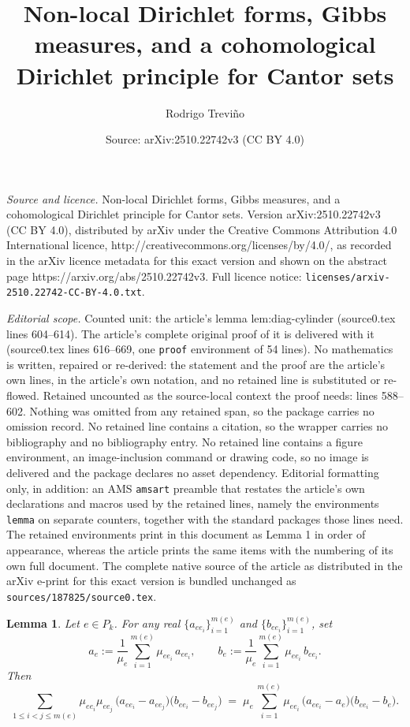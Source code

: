 \documentclass[10pt,a4paper]{amsart}
\title{Non-local Dirichlet forms, Gibbs measures, and a cohomological Dirichlet principle for Cantor sets}
\author{Rodrigo Trevi\~no}
\date{Source: arXiv:2510.22742v3 (CC BY 4.0)}
\newtheorem{lemma}{Lemma}
\begin{document}
\maketitle

\noindent\emph{Source and licence.} Non-local Dirichlet forms, Gibbs measures, and a cohomological Dirichlet principle for Cantor sets. Version arXiv:2510.22742v3 (CC BY 4.0), distributed by arXiv under the Creative Commons Attribution 4.0 International licence, http://creativecommons.org/licenses/by/4.0/, as recorded in the arXiv licence metadata for this exact version and shown on the abstract page https://arxiv.org/abs/2510.22742v3. Full licence notice: \texttt{licenses/arxiv-2510.22742-CC-BY-4.0.txt}.\par\smallskip

\noindent\textit{Editorial scope.} Counted unit: the article's lemma lem:diag-cylinder (source0.tex lines 604--614). The article's complete original proof of it is delivered with it (source0.tex lines 616--669, one \texttt{proof} environment of 54 lines). No mathematics is written, repaired or re-derived: the statement and the proof are the article's own lines, in the article's own notation, and no retained line is substituted or re-flowed.  Retained uncounted as the source-local context the proof needs: lines 588--602.  Nothing was omitted from any retained span, so the package carries no omission record.  No retained line contains a citation, so the wrapper carries no bibliography and no bibliography entry.  No retained line contains a figure environment, an image-inclusion command or drawing code, so no image is delivered and the package declares no asset dependency.  Editorial formatting only, in addition: an AMS \texttt{amsart} preamble that restates the article's own declarations and macros used by the retained lines, namely the environments \texttt{lemma} on separate counters, together with the standard packages those lines need.  The retained environments print in this document as Lemma 1 in order of appearance, whereas the article prints the same items with the numbering of its own full document.  The complete native source of the article as distributed in the arXiv e-print for this exact version is bundled unchanged as \texttt{sources/187825/source0.tex}.
\begin{lemma}
\label{lem:polar-cylinder}
Let $e\in P_k$. For any real $\{a_{ee_i}\}_{i=1}^{m(e)}$ and $\{b_{ee_i}\}_{i=1}^{m(e)}$, set
\[
a_e:=\frac{1}{\mu_e}\sum_{i=1}^{m(e)}\mu_{ee_i}\,a_{ee_i},\qquad
b_e:=\frac{1}{\mu_e}\sum_{i=1}^{m(e)}\mu_{ee_i}\,b_{ee_i}.
\]
Then
\begin{equation}
\label{eq:polar-cylinder}
\sum_{1\le i<j\le m(e)} \mu_{ee_i}\mu_{ee_j}\,\big(a_{ee_i}-a_{ee_j}\big)\big(b_{ee_i}-b_{ee_j}\big)
\;=\;
\mu_e\,\sum_{i=1}^{m(e)} \mu_{ee_i}\,\big(a_{ee_i}-a_e\big)\big(b_{ee_i}-b_e\big).
\end{equation}
\end{lemma}
\end{document}

